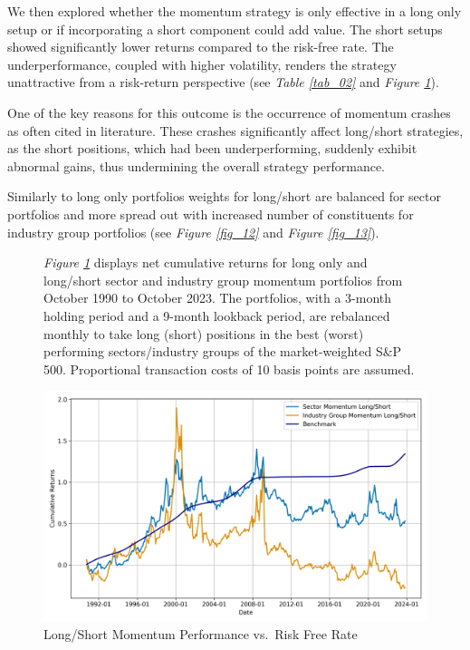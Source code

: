 \documentclass[a4paper,12pt,twoside]{article}
\begin{document}
\newpage
We then explored whether the momentum strategy is only effective in a long only setup or if incorporating a short component could add value. The short setups showed significantly lower returns compared to the risk-free rate. The underperformance, coupled with higher volatility, renders the strategy unattractive from a risk-return perspective (see \textit{Table \ref{tab_02}} and \textit{Figure \ref{fig_02}}).

One of the key reasons for this outcome is the occurrence of momentum crashes as often cited in literature. These crashes significantly affect long/short strategies, as the short positions, which had been underperforming, suddenly exhibit abnormal gains, thus undermining the overall strategy performance. 

Similarly to long only portfolios weights for long/short are balanced for sector portfolios and more spread out with increased number of constituents for industry group portfolios (see \textit{Figure \ref{fig_12}} and \textit{Figure \ref{fig_13}}). 

\begin{figure}[H] 
        \caption{Long/Short Momentum Performance vs.~Risk Free Rate} 
    \label{fig_02}
    \textit{Figure \ref{fig_02}} displays net cumulative returns for long only and long/short sector and industry group momentum portfolios from October 1990 to October 2023. The portfolios, with a 3-month holding period and a 9-month lookback period, are rebalanced monthly to take long (short) positions in the best (worst) performing sectors/industry groups of the market-weighted S\&P 500. Proportional transaction costs of 10 basis points are assumed.
    
\captionsetup{justification=centering}
\centerline{\includegraphics[width=1\textwidth]{Plots/strategy_plot_long_short.png}}
\end{figure}
\end{document}
